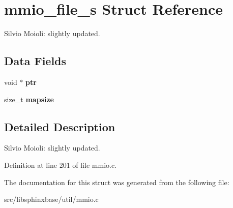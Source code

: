 \section{mmio\-\_\-file\-\_\-s Struct Reference}
\label{structmmio__file__s}


Silvio Moioli\-: slightly updated.  


\subsection*{Data Fields}
\begin{DoxyCompactItemize}
\item 
void $\ast$ {\bfseries ptr}\label{structmmio__file__s_ae1fe8bd596a0906965970108fa849b04}

\item 
size\-\_\-t {\bfseries mapsize}\label{structmmio__file__s_ab2357ad8c44382d8ccd679801692a718}

\end{DoxyCompactItemize}


\subsection{Detailed Description}
Silvio Moioli\-: slightly updated. 

Definition at line 201 of file mmio.\-c.



The documentation for this struct was generated from the following file\-:\begin{DoxyCompactItemize}
\item 
src/libsphinxbase/util/mmio.\-c\end{DoxyCompactItemize}
